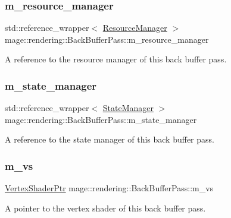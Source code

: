 \subsubsection{\texorpdfstring{m\+\_\+resource\+\_\+manager}{m\_resource\_manager}}
{\footnotesize\ttfamily std\+::reference\+\_\+wrapper$<$ \hyperlink{classmage_1_1rendering_1_1_resource_manager}{Resource\+Manager} $>$ mage\+::rendering\+::\+Back\+Buffer\+Pass\+::m\+\_\+resource\+\_\+manager\hspace{0.3cm}{\ttfamily [private]}}

A reference to the resource manager of this back buffer pass. \hypertarget{classmage_1_1rendering_1_1_back_buffer_pass_a5d10a44c5f8a3529d64aabfb590156f2}{}\label{classmage_1_1rendering_1_1_back_buffer_pass_a5d10a44c5f8a3529d64aabfb590156f2} 
\subsubsection{\texorpdfstring{m\+\_\+state\+\_\+manager}{m\_state\_manager}}
{\footnotesize\ttfamily std\+::reference\+\_\+wrapper$<$ \hyperlink{classmage_1_1rendering_1_1_state_manager}{State\+Manager} $>$ mage\+::rendering\+::\+Back\+Buffer\+Pass\+::m\+\_\+state\+\_\+manager\hspace{0.3cm}{\ttfamily [private]}}

A reference to the state manager of this back buffer pass. \hypertarget{classmage_1_1rendering_1_1_back_buffer_pass_a12a95cc800090a0bc01d14a9f5903748}{}\label{classmage_1_1rendering_1_1_back_buffer_pass_a12a95cc800090a0bc01d14a9f5903748} 
\subsubsection{\texorpdfstring{m\+\_\+vs}{m\_vs}}
{\footnotesize\ttfamily \hyperlink{namespacemage_1_1rendering_aaf704b9c54a4181f4950a1761de69dda}{Vertex\+Shader\+Ptr} mage\+::rendering\+::\+Back\+Buffer\+Pass\+::m\+\_\+vs\hspace{0.3cm}{\ttfamily [private]}}

A pointer to the vertex shader of this back buffer pass. 